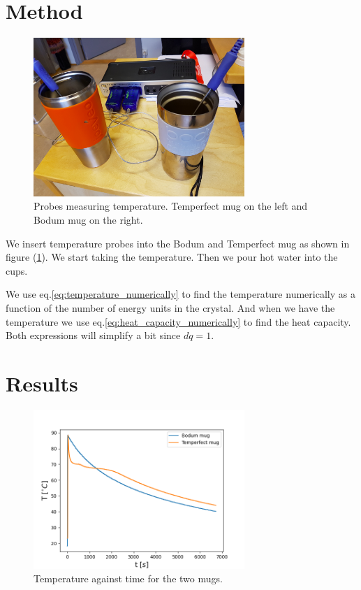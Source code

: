 \documentclass[reprint,english,notitlepage]{revtex4-1}  %
\begin{document}
\section{Method}

\begin{figure}
\centering
\includegraphics[width=8cm]{../figures/termos_bilder.png}
\caption{Probes measuring temperature. Temperfect mug on the left and Bodum mug on the right.}
\label{fig:termos_bilder}
\end{figure}

We insert temperature probes into the Bodum and Temperfect mug as shown in figure (\ref{fig:termos_bilder}). We start taking the temperature. Then we pour hot water into the cups. 

We use eq.\ref{eq:temperature_numerically} to find the temperature numerically as a function of the number of energy units in the crystal. And when we have the temperature we use eq.\ref{eq:heat_capacity_numerically} to find the heat capacity. Both expressions will simplify a bit since $dq=1$.

\section{Results}

\begin{figure}
\centering
\includegraphics[width=8cm]{../figures/mugs.png}
\caption{Temperature against time for the two mugs.}
\label{fig:mugs}
\end{figure}
\end{document}

